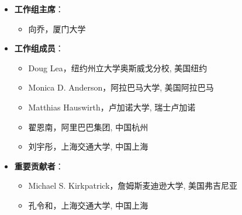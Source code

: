 \begin{itemize}
    \item \textbf{工作组主席}：
    \begin{itemize}
        \item 向乔，厦门大学
    \end{itemize}
    \item \textbf{工作组成员}：
    \begin{itemize}
        \item Doug Lea，纽约州立大学奥斯威戈分校, 美国纽约
        \item Monica D. Anderson，阿拉巴马大学, 美国阿拉巴马
        \item Matthias Hauswirth，卢加诺大学, 瑞士卢加诺
        \item 翟恩南，阿里巴巴集团, 中国杭州
        \item 刘宇彤，上海交通大学, 中国上海
    \end{itemize}
    \item \textbf{重要贡献者}：
    \begin{itemize}
        \item Michael S. Kirkpatrick，詹姆斯麦迪逊大学, 美国弗吉尼亚
        \item 孔令和，上海交通大学, 中国上海
    \end{itemize}
\end{itemize}

